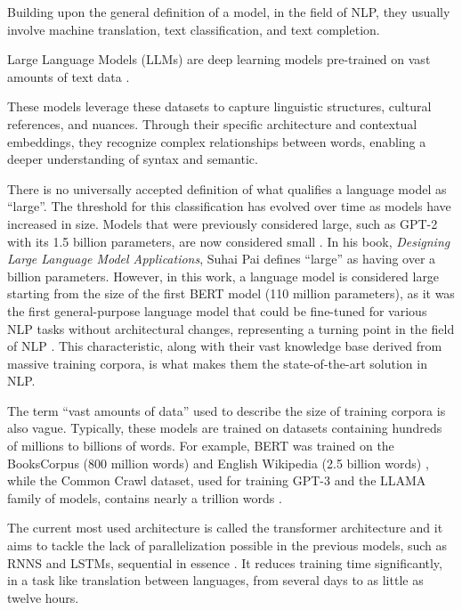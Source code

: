 Building upon the general definition of a model, in the field of NLP, they usually involve machine translation, text classification, and text completion. 

\begin{definition}
    Large Language Models (LLMs) are deep learning models pre-trained on vast amounts of text data \cite{AWS_LLM}. 
\end{definition}
These models leverage these datasets to capture linguistic structures, cultural references, and nuances. Through their specific architecture and contextual embeddings, they recognize complex relationships between words, enabling a deeper understanding of syntax and semantic.

There is no universally accepted definition of what qualifies a language model as ``large''. The threshold for this classification has evolved over time as models have increased in size. Models that were previously considered large, such as GPT-2 with its 1.5 billion parameters, are now considered small \cite{vannguyen2024surveysmalllanguagemodels}. In his book, \textit{Designing Large Language Model Applications}, Suhai Pai defines ``large'' as having over a billion parameters. However, in this work, a language model is considered large starting from the size of the first BERT model (110 million parameters), as it was the first general-purpose language model that could be fine-tuned for various NLP tasks without architectural changes, representing a turning point in the field of NLP \cite{devlin2019bert}. This characteristic, along with their vast knowledge base derived from massive training corpora, is what makes them the state-of-the-art solution in NLP.

The term ``vast amounts of data'' used to describe the size of training corpora is also vague. Typically, these models are trained on datasets containing hundreds of millions to billions of words. For example, BERT was trained on the BooksCorpus (800 million words) and English Wikipedia (2.5 billion words) \cite{devlin2019bert}, while the Common Crawl dataset, used for training GPT-3 and the LLAMA family of models, contains nearly a trillion words \cite{brown2020languagemodelsfewshotlearners,touvron2023llamaopenefficientfoundation}.

The current most used architecture is called the transformer architecture and it aims to tackle the lack of parallelization possible in the previous models, such as RNNS and LSTMs, sequential in essence \cite{vaswani2017attention}. It reduces training time significantly, in a task like translation between languages, from several days \cite{bahdanau2014neural} to as little as twelve hours.


